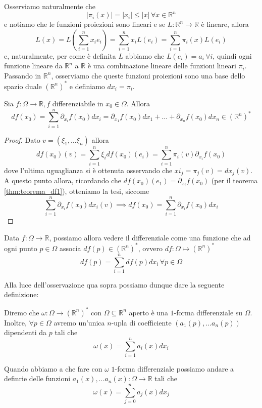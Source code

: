 Osserviamo naturalmente che
$$
|\pi_i(x)| = |x_i| \leq |x| \, \forall x \in \mathbb{R}^n
$$ 
e notiamo che le funzioni proiezioni sono lineari e se $L: \mathbb{R}^n \to \mathbb{R}$ è lineare, allora
$$
L(x) = L \left( \sum_{i=1}^n x_i e_i \right) = \sum_{i=1}^n x_i L(e_i) = \sum_{i=1}^n \pi_i(x) L(e_i)
$$
e, naturalmente, per come è definita $L$ abbiamo che $L(e_i) = a_i \, \forall i$, quindi ogni funzione lineare da $\mathbb{R}^n$ a $\mathbb{R}$ è una combinazione lineare delle funzioni lineari $\pi_i$. \\
Passando in $\mathbb{R}^n$, osserviamo che queste funzioni proiezioni sono una base dello spazio duale $(\mathbb{R}^n)^{*}$ e definiamo $dx_i = \pi_i$. \\
\begin{prop}
Sia $f: \Omega \to \mathbb{R}, f$ differenziabile in $x_0 \in \Omega$. Allora
$$
df(x_0) = \sum_{i=1}^n \partial_{x_i} f(x_0)dx_i = \partial_{x_1} f(x_0)dx_1 + \ldots + \partial_{x_n} f(x_0)dx_n \in (\mathbb{R}^n)^{*}
$$
\end{prop}
\begin{proof}
Dato $v=(\xi_1, \ldots \xi_n)$ allora
$$
df(x_0)(v) = \sum_{i=1}^n \xi_i df(x_0)(e_i) = \sum_{i=1}^n \pi_i(v) \partial_{x_i} f(x_0)$$
dove l'ultima uguaglianza si è ottenuta osservando che $xi_j = \pi_j(v) = dx_j(v)$. A questo punto allora, ricordando che $df(x_0)(e_1) = \partial_{x_i} f(x_0)$ (per il teorema \ref{thm:teorema_df1}), otteniamo la tesi, siccome
$$\sum_{i=1}^n \partial_{x_i} f(x_0) dx_i(v) \implies df(x_0) = \sum_{i=1}^n \partial_{x_i} f(x_0) dx_i
$$
\end{proof}
\begin{remark}
Data $f: \Omega \to \mathbb{R}$, possiamo allora vedere il differenziale come una funzione che ad ogni punto $p \in \Omega$ associa $df(p) \in (\mathbb{R}^n)^{*}$, ovvero $df: \Omega \mapsto (\mathbb{R}^n)^{*}$
$$
df(p) = \sum_{i=1}^n df(p)dx_i \, \forall p \in \Omega
$$
\end{remark}
Alla luce dell'osservazione qua sopra possiamo dunque dare la seguente definizione:
\begin{definition}
Diremo che $\omega: \Omega \to (\mathbb{R}^n)^{*}$ con $\Omega \subseteq \mathbb{R}^n$ aperto è una $1$-forma differenziale su $\Omega$. Inoltre, $\forall p \in \Omega$ avremo un'unica $n$-upla di coefficiente $(a_1(p), \ldots a_n(p))$ dipendenti da $p$ tali che
$$
\omega(x) = \sum_{i=1}^n a_i(x)dx_i
$$
\end{definition}
\begin{remark}
\noindent Quando abbiamo a che fare con $\omega$ $1$-forma differenziale possiamo andare a definrie delle funzioni $a_1(x), \ldots a_n(x): \Omega \to \mathbb{R}$ tali che
$$
\omega(x) = \sum_{j=0}^n a_j(x)dx_j
$$
\end{remark}
